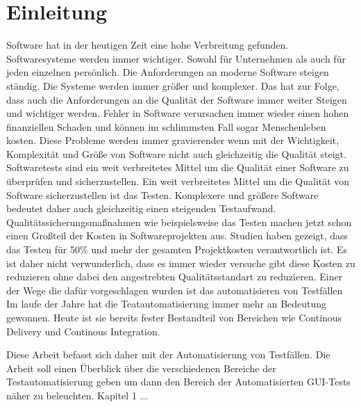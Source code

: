 \chapter{Einleitung}
\label{sec:einleitung}

Software hat in der heutigen Zeit eine hohe Verbreitung gefunden. Softwaresysteme werden immer wichtiger. Sowohl für Unternehmen als auch für jeden einzelnen persönlich. Die Anforderungen an moderne Software steigen ständig. Die Systeme werden immer größer und komplexer. Das hat zur Folge, dass auch die Anforderungen an die Qualität der Software immer weiter Steigen und wichtiger werden.
Fehler in Software verursachen immer wieder einen hohen finanziellen Schaden und können im schlimmsten Fall sogar Menschenleben kosten. Diese Probleme werden immer gravierender wenn mit der Wichtigkeit, Komplexität und Größe von Software nicht auch gleichzeitig die Qualität steigt. \cite{burnstein_practical_2003} \newline
Softwaretests sind ein weit verbreitetes Mittel um die Qualität einer Software zu überprüfen und sicherzustellen. Ein weit verbreitetes Mittel um die Qualität von Software sicherzustellen ist das Testen.
Komplexere und größere Software bedeutet daher auch gleichzeitig einen steigenden Testaufwand.\newline
Qualitätssicherungsmaßnahmen wie beispielsweise das Testen machen jetzt schon einen Großteil der Kosten in Softwareprojekten aus. Studien haben gezeigt, dass das Testen für 50\% und mehr der gesamten Projektkosten verantwortlich ist. \cite{ramler_economic_2006} 
Es ist daher nicht verwunderlich, dass es immer wieder versuche gibt diese Kosten zu reduzieren ohne dabei den angestrebten Qualitätsstandart zu reduzieren.
Einer der Wege die dafür vorgeschlagen wurden ist das automatisieren von Testfällen 
\cite{harrold_testing:_2000}
Im laufe der Jahre hat die Teatautomatisierung immer mehr an Bedeutung gewonnen. Heute ist sie bereits fester Bestandteil von Bereichen wie Continous Delivery und Continous Integration.

Diese Arbeit befasst sich daher mit der Automatisierung von Testfällen. Die Arbeit soll einen Überblick über die verschiedenen Bereiche der Testautomatisierung geben um dann den Bereich der Automatisierten GUI-Tests näher zu beleuchten.
Kapitel 1 ...





